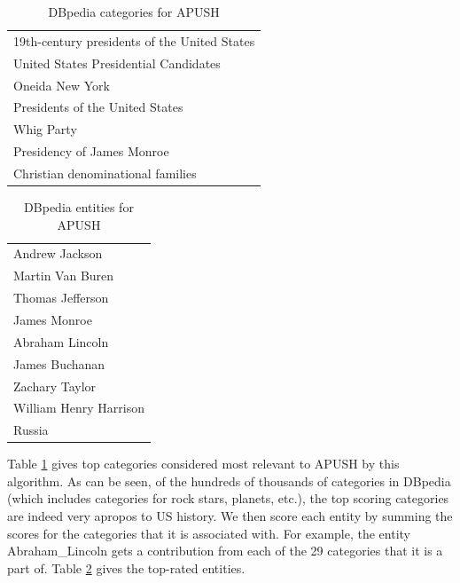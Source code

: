 \documentclass[pdfpagelabels=false,plainpages=true]{acm_proc_article-sp}
\begin{document}
\begin{table}
\begin{center}
\begin{tabular}{|l|} \hline
19th-century presidents of the United States \\
United States Presidential Candidates \\
Oneida New York \\
Presidents of the United States \\
Whig Party \\
Presidency of James Monroe \\
Christian denominational families \\
\hline \end{tabular}
\caption{DBpedia categories for APUSH}
\label{tab-categories}
\end{center}
\end{table}

\begin{table}
\begin{center}
\begin{tabular}{|l|} \hline
Andrew Jackson \\
Martin Van Buren \\
Thomas Jefferson \\
James Monroe \\
Abraham Lincoln \\
James Buchanan \\
Zachary Taylor \\
William Henry Harrison \\
Russia \\
\hline\end{tabular}
\caption{DBpedia entities for APUSH}
\label{tab-entities}
\end{center}
\end{table}

Table \ref{tab-categories} gives top categories considered most relevant to
APUSH by this algorithm. As can be seen, of the hundreds of thousands of
categories in DBpedia (which includes categories for rock stars, planets, etc.), the
top scoring categories are indeed very apropos to US history.           
We then score each entity by summing the scores for the categories that it is
associated with. For example, the entity Abraham\_Lincoln gets a contribution
from each of the 29 categories that it is a part of. Table \ref{tab-entities}
gives the top-rated entities. 
\end{document}
